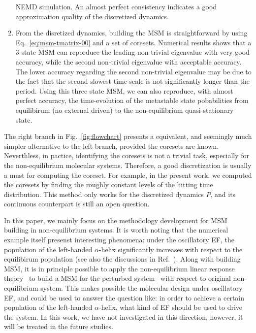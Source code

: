 \documentclass[aps, pre, preprint,unsortedaddress,a4paper,onecolumn]{revtex4}
\begin{document}
\begin{enumerate}
  NEMD simulation. An almost perfect consistency 
  indicates a good approximation quality of the discretized dynamics.
\item From the disretized dynamics, building the MSM is straightforward
  by using Eq.~\eqref{eq:msm-tmatrix-00} and a set of coresets.
  Numerical results shows that a 3-state MSM can reporduce the leading
  non-trivial eigenvalue with very good accuracy, while the second
  non-trivial eigenvalue with acceptable accuracy. The lower accuracy
  regarding the second non-trivial eigenvalue may be due to the fact that
  the second slowest time-scale is not significantly longer than the
  period. Using this three state MSM, we can also reproduce, with
  almost perfect accuracy, the 
  time-evolution of the metastable state
  pobabilities from equilibirum (no external driven)
  to the non-equilibrium quasi-stationary state.
\end{enumerate}

The right branch in Fig.~\ref{fig:flowchart} presents a
equivalent, and seemingly
much simpler alternative to the left branch, provided the
coresets are known. Neverthless, in pactice, identifying
the coresets is not a trivial task, especially for the
non-equilibrium molecular systems.
Therefore, a good discretization is  usually a must for computing the coreset.
For example, in the present work, we computed the coresets by
finding the roughly constant levels of the hitting time distribution.
This method only works for the discretized dynamics $P$, and its continuous
counterpart is still an open question.

In this paper, we mainly focus on the methodology development for MSM
building in non-equilibrium systems. It is worth noting that the
numerical example itself presenst interesting phenomena: under the
oscillatory EF, the population of the left-handed $\alpha$-helix
significantly increases with respect to the equilibirum population
(see also the discussions in Ref.~\cite{wang2014exploring}).  Along
with building MSM, it is in principle possible to apply the non-equilibrium
linear response theory~\cite{wang2013linear} to build a MSM for the perturbed
system~\cite{schutte2014markov} with respect to original
non-equilibrium system. This makes possible the molecular design under
oscillatory EF, and could be used to answer the question like:
in order to achieve a certain population of  the left-handed $\alpha$-helix,
what kind of EF should be used to drive the system.
In this work, we have not investigated in this direction, however, it will
be treated in the future studies.
\end{document}
